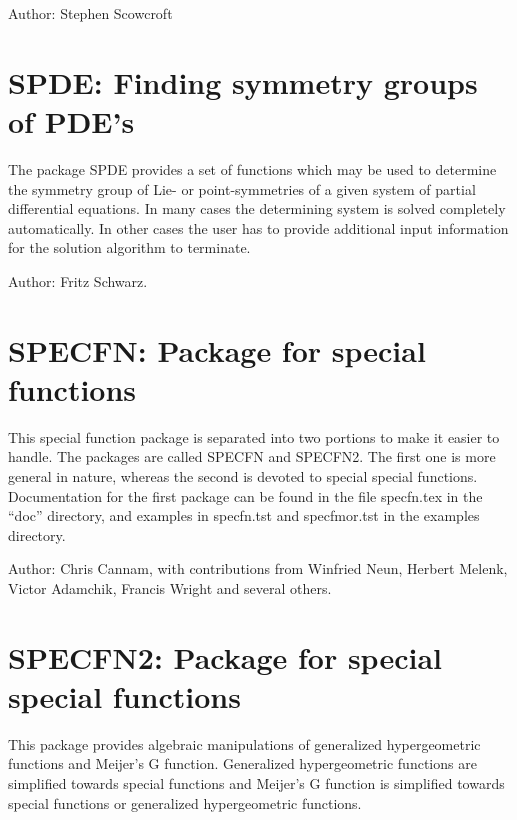 Author: Stephen Scowcroft


\newpage

\section{SPDE: Finding symmetry groups of {PDE}'s}


The package SPDE provides a set of functions which may be used to
determine the symmetry group of Lie- or point-symmetries of a given system
of partial differential equations. In many cases the determining system is
solved completely automatically. In other cases the user has to provide
additional input information for the solution algorithm to terminate.

Author: Fritz Schwarz.


\newpage

\section{SPECFN: Package for special functions} 

This special function package is separated into two portions to make it
easier to handle.  The packages are called SPECFN and SPECFN2.  The first
one is more general in nature, whereas the second is devoted to special
special functions.  Documentation for the first package can be found in
the file specfn.tex in the ``doc'' directory, and examples in specfn.tst
and specfmor.tst in the examples directory.

Author:  Chris Cannam, with contributions from Winfried Neun, Herbert
Melenk, Victor Adamchik, Francis Wright and several others.


\section{SPECFN2: Package for special special functions} 


This package provides algebraic manipulations of generalized
hypergeometric functions and Meijer's G function.  Generalized
hypergeometric functions are simplified towards special functions and
Meijer's G function is simplified towards special functions or generalized
hypergeometric functions.

